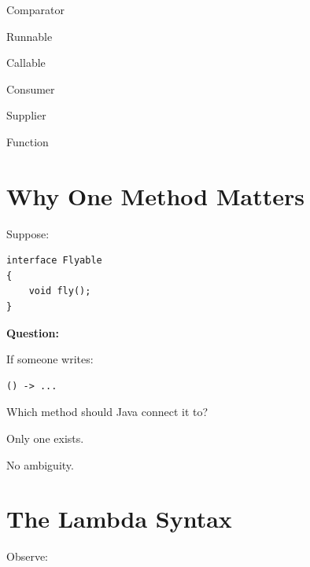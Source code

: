 \documentclass[11pt,a4paper]{book}
\begin{document}
Comparator


Runnable


Callable


Consumer


Supplier


Function


\section{Why One Method Matters}

Suppose:

\begin{verbatim} 
interface Flyable
{
    void fly();
}
\end{verbatim}


\textbf{Question:}

If someone writes:

\begin{verbatim} 
() -> ...
\end{verbatim}


Which method should Java connect it to?


Only one exists.


No ambiguity.


\section{The Lambda Syntax}\label{sec:lambda_syntax}
Observe:
\end{document}
